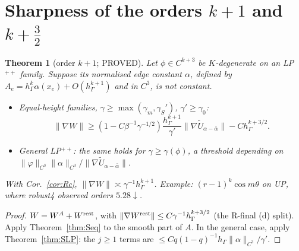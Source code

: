 \documentclass[11pt]{article}
\newtheorem{theorem}{Theorem}[section]
\theoremstyle{remark}
\newcommand{\hG}{h_\Gamma}
\begin{document}
\section{Sharpness of the orders $k+1$ and $k+\frac32$}
\begin{theorem}[order $k+1$; PROVED]\label{thm:k1}
Let $\phi\in C^{k+3}$ be $K$-degenerate on an LP$^{++}$ family. Suppose its normalised edge constant $\alpha$, defined by $A_e=\hG^k\alpha(x_e)+O(\hG^{k+1})$ and in $C^3$, is not constant.
\begin{itemize}
\item \emph{Equal-height families, $\gamma\ge\max(\gamma_m,\gamma_S')$, $\gamma'\ge\gamma_0$:}
\[
\|\nabla W\|\ge(1-C\beta^{-1}\gamma^{-1/2})\frac{\hG^{k+1}}{\gamma'}\|\nabla\tilde U_{\alpha-\bar\alpha}\|-C\hG^{k+3/2}.
\]
\item \emph{General LP$^{++}$:} the same holds for $\gamma\ge\gamma(\phi)$, a threshold depending on $\|\varphi\|_{C^3}\|\alpha\|_{C^3}/\|\nabla\tilde U_{\alpha-\bar\alpha}\|$.
\end{itemize}
With Cor.~\ref{cor:Rc}, $\|\nabla W\|\asymp\gamma^{-1}\hG^{k+1}$. Example: $(r-1)^k\cos m\theta$ on \textsf{UP}, where robust4 observed orders $5.28\downarrow$.
\end{theorem}
\begin{proof}
$W=W^{A}+W^{\rm rest}$, with $\|\nabla W^{\rm rest}\|\le C\gamma^{-1}\hG^{k+3/2}$ (the R-final (d) split). Apply Theorem~\ref{thm:Seq} to the smooth part of $A$.
In the general case, apply Theorem~\ref{thm:SLP}: the $j\ge1$ terms are $\le Cq(1-q)^{-1}\hG\|\alpha\|_{C^3}/\gamma'$.
\end{proof}
\end{document}
